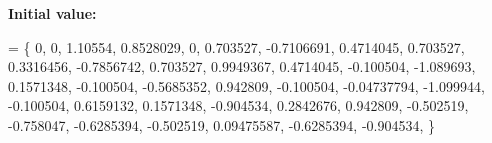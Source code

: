 {\bfseries Initial value\+:}
\begin{DoxyCode}
= \{
    0, 0, 1.10554,
    0.8528029, 0, 0.703527,
    -0.7106691, 0.4714045, 0.703527,
    0.3316456, -0.7856742, 0.703527,
    0.9949367, 0.4714045, -0.100504,
    -1.089693, 0.1571348, -0.100504,
    -0.5685352, 0.942809, -0.100504,
    -0.04737794, -1.099944, -0.100504,
    0.6159132, 0.1571348, -0.904534,
    0.2842676, 0.942809, -0.502519,
    -0.758047, -0.6285394, -0.502519,
    0.09475587, -0.6285394, -0.904534,
\}
\end{DoxyCode}
